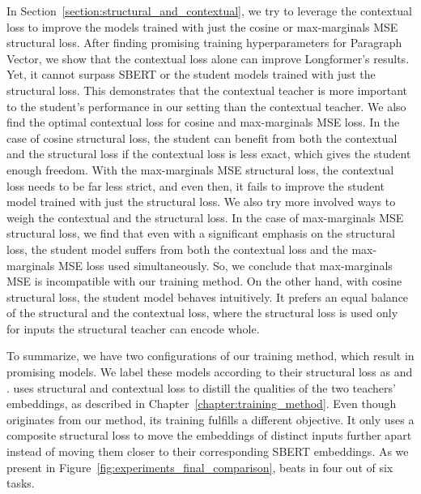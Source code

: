 In Section~\ref{section:structural_and_contextual}, we try to leverage the
contextual loss to improve the models trained with just the cosine or
max-marginals MSE structural loss. After finding promising training
hyperparameters for Paragraph Vector, we show that the contextual loss alone
can improve Longformer's results. Yet, it cannot surpass SBERT or the student
models trained with just the structural loss. This demonstrates that the
contextual teacher is more important to the student's performance in our
setting than the contextual teacher. We also find the optimal contextual loss
for cosine and max-marginals MSE loss. In the case of cosine structural loss,
the student can benefit from both the contextual and the structural loss if the
contextual loss is less exact, which gives the student enough freedom. With the
max-marginals MSE structural loss, the contextual loss needs to be far less
strict, and even then, it fails to improve the student model trained with just
the structural loss. We also try more involved ways to weigh the contextual and
the structural loss. In the case of max-marginals MSE structural loss, we find
that even with a significant emphasis on the structural loss, the student model
suffers from both the contextual loss and the max-marginals MSE loss used
simultaneously. So, we conclude that max-marginals MSE is incompatible with our
training method. On the other hand, with cosine structural loss, the student
model behaves intuitively. It prefers an equal balance of the structural and
the contextual loss, where the structural loss is used only for inputs the
structural teacher can encode whole.

To summarize, we have two configurations  of our training method, which result
in promising models. We label these models according to their structural loss
as  and .  uses structural and
contextual loss to distill the qualities of the two teachers' embeddings, as
described in Chapter~\ref{chapter:training_method}. Even though 
originates from our method, its training fulfills a different objective. It
only uses a composite structural loss to move the embeddings of distinct inputs
further apart instead of moving them closer to their corresponding SBERT
embeddings. As we present in Figure~\ref{fig:experiments_final_comparison},
 beats  in four out of six tasks.

